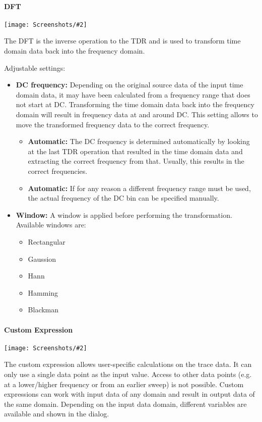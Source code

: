 \documentclass[a4paper,11pt]{article}
\newcommand{\screenshot}[2]{\begin{center}
\texttt{[image: Screenshots/\#2]}
\end{center}}
\begin{document}
\paragraph{DFT}
\screenshot{0.4}{MathOpDFT.png}
The DFT is the inverse operation to the TDR and is used to transform time domain data back into the frequency domain.

Adjustable settings:
\begin{itemize}
\item \textbf{DC frequency:} Depending on the original source data of the input time domain data, it may have been calculated from a frequency range that does not start at DC. Transforming the time domain data back into the frequency domain will result in frequency data at and around DC. This setting allows to move the transformed frequency data to the correct frequency.
\begin{itemize}
\item \textbf{Automatic:} The DC frequency is determined automatically by looking at the last TDR operation that resulted in the time domain data and extracting the correct frequency from that. Usually, this results in the correct frequencies.
\item \textbf{Automatic:} If for any reason a different frequency range must be used, the actual frequency of the DC bin can be specified manually.
\end{itemize}
\item \textbf{Window:} A window is applied before performing the transformation. Available windows are:
\begin{itemize}
\item Rectangular
\item Gaussion
\item Hann
\item Hamming
\item Blackman
\end{itemize}
\end{itemize}
\paragraph{Custom Expression}
\screenshot{1.0}{MathOpCustomExpression.png}
The custom expression allows user-specific calculations on the trace data. It can only use a single data point as the input value. Access to other data points (e.g. at a lower/higher frequency or from an earlier sweep) is not possible. Custom expressions can work with input data of any domain and result in output data of the same domain. Depending on the input data domain, different variables are available and shown in the dialog.
\end{document}
